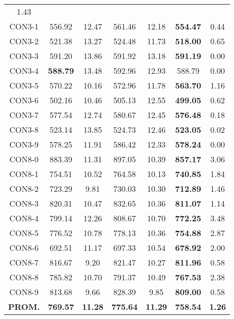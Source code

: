 \begin{table}[ht]
\begin{tabular}{c c c c c c c}
1.43\\CON3-1 & 556.92 & 12.47 & 
561.46 & 12.18 & \bf{554.47} & 
0.44\\CON3-2 & 521.38 & 13.27 & 
524.48 & 11.73 & \bf{518.00} & 
0.65\\CON3-3 & 591.20 & 13.86 & 
591.92 & 13.18 & \bf{591.19} & 
0.00\\CON3-4 & \bf{588.79} & 13.48 & 
592.96 & 12.93 & 588.79 & 0.00\\
CON3-5 & 570.22 & 10.16 & 
572.96 & 11.78 & \bf{563.70} & 
1.16\\CON3-6 & 502.16 & 10.46 & 
505.13 & 12.55 & \bf{499.05} & 
0.62\\CON3-7 & 577.54 & 12.74 & 
580.67 & 12.45 & \bf{576.48} & 
0.18\\CON3-8 & 523.14 & 13.85 & 
524.73 & 12.46 & \bf{523.05} & 
0.02\\CON3-9 & 578.25 & 11.91 & 
586.42 & 12.33 & \bf{578.24} & 
0.00\\CON8-0 & 883.39 & 11.31 & 
897.05 & 10.39 & \bf{857.17} & 
3.06\\CON8-1 & 754.51 & 10.52 & 
764.58 & 10.13 & \bf{740.85} & 
1.84\\CON8-2 & 723.29 & 9.81 & 
730.03 & 10.30 & \bf{712.89} & 
1.46\\CON8-3 & 820.31 & 10.47 & 
832.65 & 10.36 & \bf{811.07} & 
1.14\\CON8-4 & 799.14 & 12.26 & 
808.67 & 10.70 & \bf{772.25} & 
3.48\\CON8-5 & 776.52 & 10.78 & 
778.13 & 10.36 & \bf{754.88} & 
2.87\\CON8-6 & 692.51 & 11.17 & 
697.33 & 10.54 & \bf{678.92} & 
2.00\\CON8-7 & 816.67 & 9.20 & 
821.47 & 10.27 & \bf{811.96} & 
0.58\\CON8-8 & 785.82 & 10.70 & 
791.37 & 10.49 & \bf{767.53} & 
2.38\\CON8-9 & 813.68 & 9.66 & 
828.39 & 9.85 & \bf{809.00} & 
0.58\\\bf{PROM.} & 
\bf{769.57} & \bf{11.28} & \bf{775.64} & \bf{11.29} & \bf{758.54} & \bf{1.26}\\[1ex]\hline
\end{tabular}
\label{table:nonlin}
\end{table} \clearpage
